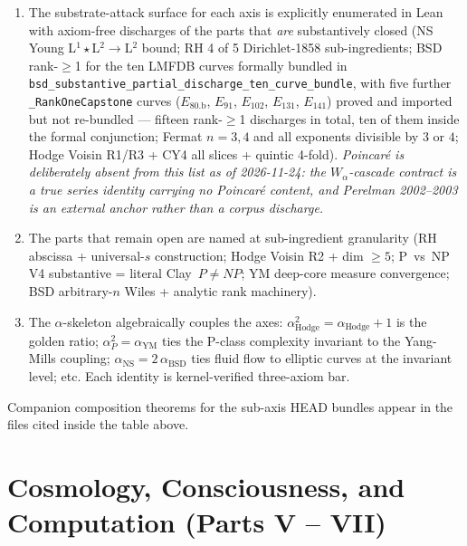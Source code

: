 \begin{enumerate}
\item The substrate-attack surface for each axis is explicitly
  enumerated in Lean with axiom-free discharges of the parts that
  \emph{are} substantively closed (NS Young L$^1 \star$L$^2 \to$L$^2$
  bound; RH 4 of 5 Dirichlet-1858 sub-ingredients; BSD rank-$\geq$1 for
  the ten LMFDB curves formally bundled in
  \texttt{bsd\_substantive\_partial\_discharge\_ten\_curve\_bundle},
  with five further \texttt{\_RankOneCapstone} curves
  ($E_{80.\text{b}}$, $E_{91}$, $E_{102}$, $E_{131}$, $E_{141}$)
  proved and imported but not re-bundled --- fifteen rank-$\geq$1
  discharges in total, ten of them inside the formal conjunction;
  Fermat $n = 3, 4$ and all exponents divisible by $3$ or $4$;
  Hodge Voisin R1/R3 + CY4 all slices + quintic 4-fold).
  \emph{Poincar\'e is deliberately absent from this list as of
  2026-11-24: the $W_\alpha$-cascade contract is a true series
  identity carrying no Poincar\'e content, and Perelman 2002--2003 is
  an external anchor rather than a corpus discharge.}
\item The parts that remain open are named at sub-ingredient
  granularity (RH abscissa + universal-$s$ construction; Hodge
  Voisin R2 + dim $\geq 5$; P~vs~NP V4 substantive = literal
  Clay~$P \neq NP$; YM deep-core measure convergence; BSD arbitrary-$n$
  Wiles + analytic rank machinery).
\item The $\alpha$-skeleton algebraically couples the axes:
  $\alpha_{\text{Hodge}}^2 = \alpha_{\text{Hodge}} + 1$ is the golden
  ratio; $\alpha_P^2 = \alpha_{\text{YM}}$ ties the P-class complexity
  invariant to the Yang-Mills coupling; $\alpha_{\text{NS}} = 2\,\alpha_{\text{BSD}}$
  ties fluid flow to elliptic curves at the invariant level; etc.
  Each identity is kernel-verified three-axiom bar.
\end{enumerate}

Companion composition theorems for the sub-axis HEAD bundles
appear in the files cited inside the table above.

\FloatBarrier

\section{Cosmology, Consciousness, and Computation (Parts V -- VII)}
\label{sec:lean-xref-cosmo-consciousness-computation}

